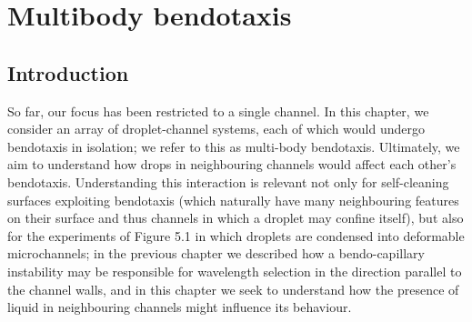 

\newcommand{\xrightj}{x_{j}^{+}}
\newcommand{\xleftj}{x_{j}^{-}}
\newcommand{\xrightjj}{x_{j+1}^{+}}
\newcommand{\xleftjj}{x_{j+1}^{-}}
\renewcommand{\xright}[1]{x_{+}^{#1}}
\renewcommand{\xleft}[1]{x_{-}^{#1}}

\newcommand{\xbarj}{\bar{x}_j}
\newcommand{\ellj}{\ell_j}
\newcommand{\xbar}{\bar{x}}
\newcommand{\dtheta}{\left(\theta_{j+1/2} - \theta_{j-1/2}\right)}
\newcommand{\ddeltatheta}{\left(\dot{\theta}_{j+1/2}-\dot{\theta}_{j-1/2}\right)}
\newcommand{\ddeltathetaN}{\left(\dot{\theta}_{j+3/2}-\dot{\theta}_{j+1/2}\right)}
\newcommand{\xbark}[1]{\bar{x}_{#1}}
\newcommand{\ellk}[1]{\ell_{#1}}
\newcommand{\sgn}{\mathrm{sgn}}
\newcommand{\hbrj}[1]{\left(1 + \bar{x}_{#1} \Delta \theta_{#1}\right)}
\newcommand{\dthetaj}{\Delta \theta_j}
\newcommand{\huj}{1 + (\bar{x}_j + \ell_j)\Delta \theta_j}
\newcommand{\hlj}{1 + (\bar{x}_j - \ell_j)\Delta \theta_j}
\newcommand{\geompar}{\mu}
\newcommand{\eps}{\delta}
\newcommand\numberthis{\addtocounter{equation}{1}\tag{\theequation}}
\newcommand{\viscdamp}{C^{\text{d}}}
\renewcommand{\th}{\text{th}}

\DeclarePairedDelimiter\ceil{\lceil}{\rceil}
\DeclarePairedDelimiter\floor{\lfloor}{\rfloor}


\graphicspath{{./Sections/Chapter6_multibody/figures/}}
\chapter{Multibody bendotaxis}\label{Ch:MultibodyBendotaxis}

\section{Introduction}\label{S:Intro}
So far, our focus has been restricted to a single channel. In this chapter, we consider an array of droplet-channel systems, each of which would undergo bendotaxis in isolation; we refer to this as multi-body bendotaxis. Ultimately, we aim to understand how drops in neighbouring channels would affect each other's bendotaxis. Understanding this interaction is relevant not only for self-cleaning surfaces exploiting bendotaxis (which naturally have many neighbouring features on their surface and thus channels in which a droplet may confine itself), but also for the experiments of Figure 5.1 in which droplets are condensed into deformable microchannels; in the previous chapter we described how a bendo-capillary instability may be responsible for wavelength selection in the direction parallel to the channel walls, and in this chapter we seek to understand how the presence of liquid in neighbouring channels might influence its behaviour.

